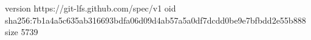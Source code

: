 version https://git-lfs.github.com/spec/v1
oid sha256:7b1a4a5c635ab316693bdfa06d09d4ab57a5a0df7dcdd0be9e7bfbdd2e55b888
size 5739
